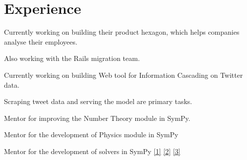 \documentclass[]{deedy-resume-openfont}
\begin{document}
\hfill
\begin{minipage}[t]{0.66\textwidth} 


\section{Experience}


\vspace{\topsep}
\begin{tightemize}
\item Currently working on building their product hexagon, which helps companies
analyse their employees.
\item Also working with the Rails migration team.
\end{tightemize}
\sectionsep

\vspace{\topsep}
\begin{tightemize}
\item Currently working on building Web tool for Information Cascading on Twitter data.
\item Scraping tweet data and serving the model are primary tasks.
\end{tightemize}
\sectionsep

\vspace{\topsep} %
\begin{tightemize}
\item Mentor for improving the Number Theory module in SymPy.
\item Mentor for the development of Physics module in SymPy
\item Mentor for the development of solvers in SymPy
\href{https://summerofcode.withgoogle.com/projects/#5233982339284992}{[1]}
\href{https://summerofcode.withgoogle.com/archive/2019/projects/5351176374059008/}{[2]}
\href{https://summerofcode.withgoogle.com/archive/2019/projects/4722757948932096/}{[3]}
\end{tightemize}
\sectionsep


\end{minipage}
\end{document}

